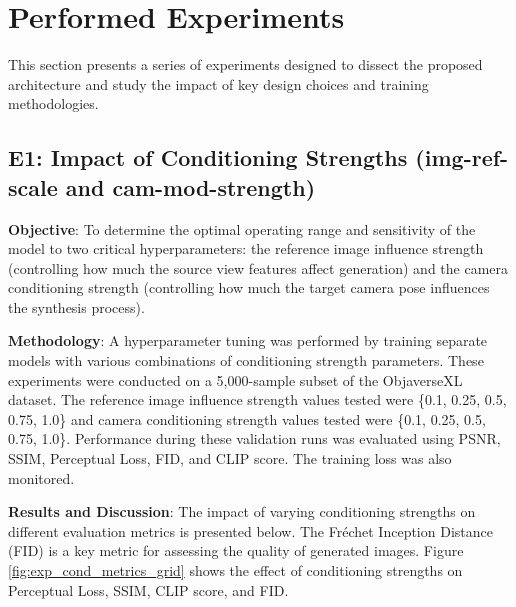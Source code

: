 \section{Performed Experiments}\label{sec:exp_analysis}

This section presents a series of experiments designed to dissect the proposed architecture and study the impact of key design choices and training methodologies.

\subsection{E1: Impact of Conditioning Strengths (img-ref-scale and cam-mod-strength)}\label{ssec:exp_conditioning_strengths}

\textbf{Objective}:
To determine the optimal operating range and sensitivity of the model to two critical hyperparameters: the reference image influence strength (controlling how much the source view features affect generation) and the camera conditioning strength (controlling how much the target camera pose influences the synthesis process).

\textbf{Methodology}:
A hyperparameter tuning was performed by training separate models with various combinations of conditioning strength parameters. These experiments were conducted on a 5,000-sample subset of the ObjaverseXL dataset. The reference image influence strength values tested were \{0.1, 0.25, 0.5, 0.75, 1.0\} and camera conditioning strength values tested were \{0.1, 0.25, 0.5, 0.75, 1.0\}. Performance during these validation runs was evaluated using PSNR, SSIM, Perceptual Loss, FID, and CLIP score. The training loss was also monitored.

\textbf{Results and Discussion}:
The impact of varying conditioning strengths on different evaluation metrics is presented below. The Fréchet Inception Distance (FID) is a key metric for assessing the quality of generated images.
Figure \ref{fig:exp_cond_metrics_grid} shows the effect of conditioning strengths on Perceptual Loss, SSIM, CLIP score, and FID.


